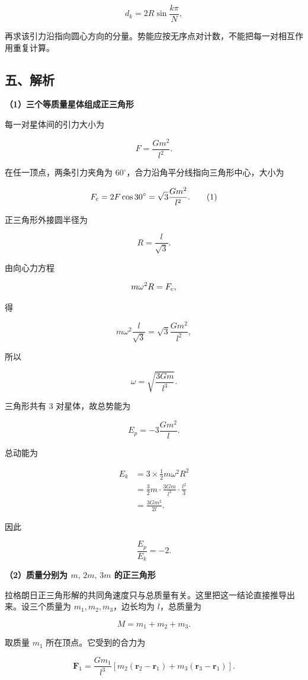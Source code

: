 \documentclass[12pt,a4paper,UTF8]{ctexart}
\begin{document}
\[
d_k=2R\sin\frac{k\pi}{N},
\]

再求该引力沿指向圆心方向的分量。势能应按无序点对计数，不能把每一对相互作用重复计算。

\subsection{五、解析}\label{ux4e94ux89e3ux6790-1}

\textbf{（1）三个等质量星体组成正三角形}

每一对星体间的引力大小为

\[
F=\frac{Gm^2}{l^2}.
\]

在任一顶点，两条引力夹角为
\(60^\circ\)，合力沿角平分线指向三角形中心，大小为

\[
F_{\rm c}=2F\cos30^\circ
=\sqrt3\frac{Gm^2}{l^2}.
\tag{1}
\]

正三角形外接圆半径为

\[
R=\frac{l}{\sqrt3}.
\]

由向心力方程

\[
m\omega^2R=F_{\rm c},
\]

得

\[
m\omega^2\frac{l}{\sqrt3}
=\sqrt3\frac{Gm^2}{l^2},
\]

所以

\[
\boxed{\omega=\sqrt{\frac{3Gm}{l^3}}}.
\tag{2}
\]

三角形共有 \(3\) 对星体，故总势能为

\[
E_p=-3\frac{Gm^2}{l}.
\tag{3}
\]

总动能为

\[
\begin{aligned}
E_k
&=3\times\frac12m\omega^2R^2\\
&=\frac32m\cdot\frac{3Gm}{l^3}\cdot\frac{l^2}{3}\\
&=\frac{3Gm^2}{2l}.
\end{aligned}
\tag{4}
\]

因此

\[
\boxed{\frac{E_p}{E_k}=-2}.
\tag{5}
\]

\textbf{（2）质量分别为 \(m,\,2m,\,3m\) 的正三角形}

拉格朗日正三角形解的共同角速度只与总质量有关。这里把这一结论直接推导出来。设三个质量为
\(m_1,m_2,m_3\)，边长均为 \(l\)，总质量为

\[
M=m_1+m_2+m_3.
\]

取质量 \(m_1\) 所在顶点。它受到的合力为

\[
\bm F_1
=\frac{Gm_1}{l^3}\left[m_2(\bm r_2-\bm r_1)+m_3(\bm r_3-\bm r_1)\right].
\]
\end{document}
